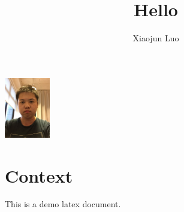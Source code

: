 \documentclass[a4paper,12pt]{article}
\title{Hello}
\author{Xiaojun Luo}
\begin{document}
\maketitle{}

\includegraphics[height=100px]{webwxgetmsgimg.jpeg}

\section{Context}
This is a demo latex document.
\end{document}
